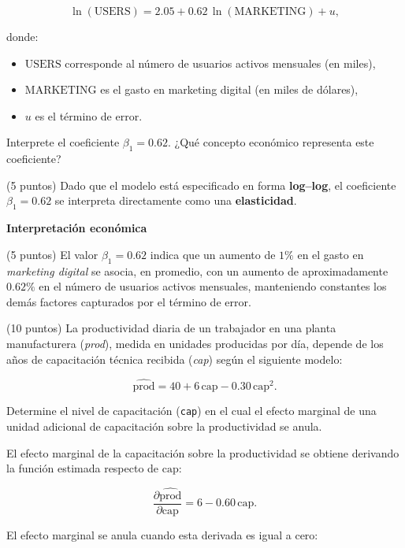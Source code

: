 \documentclass[10pt,a4paper]{article}
\begin{document}
\[
\ln(\text{USERS})
= 2.05 + 0.62\,\ln(\text{MARKETING}) + u,
\]

donde:
\begin{itemize}
    \item $\text{USERS}$ corresponde al número de usuarios activos mensuales (en miles),
    \item $\text{MARKETING}$ es el gasto en marketing digital (en miles de dólares),
    \item $u$ es el término de error.
\end{itemize}

Interprete el coeficiente $\beta_1 = 0.62$.  
¿Qué concepto económico representa este coeficiente?

\color{blue}
\vspace{0.5cm}
(5 puntos) Dado que el modelo está especificado en forma \textbf{log--log}, el coeficiente
\(\beta_1 = 0.62\) se interpreta directamente como una \textbf{elasticidad}.

\medskip

\textbf{Interpretación económica}

(5 puntos) El valor \(\beta_1 = 0.62\) indica que un aumento de \(1\%\) en el gasto en
\textit{marketing digital} se asocia, en promedio, con un aumento de
aproximadamente \(0.62\%\) en el número de usuarios activos mensuales,
manteniendo constantes los demás factores capturados por el término de error.

\color{black}

\vspace{1cm}
\item (10 puntos) La productividad diaria de un trabajador en una planta
manufacturera (\emph{prod}), medida en unidades producidas por día, depende
de los años de capacitación técnica recibida (\emph{cap}) según el siguiente
modelo:

\[
\widehat{\text{prod}}
= 40 + 6\,\text{cap} - 0.30\,\text{cap}^2.
\]

Determine el nivel de capacitación (\texttt{cap}) en el cual el efecto marginal
de una unidad adicional de capacitación sobre la productividad se anula.

\color{blue}
El efecto marginal de la capacitación sobre la productividad se obtiene
derivando la función estimada respecto de \(\text{cap}\):

\[
\frac{\partial \widehat{\text{prod}}}{\partial \text{cap}}
= 6 - 0.60\,\text{cap}.
\]

El efecto marginal se anula cuando esta derivada es igual a cero:
\end{document}
